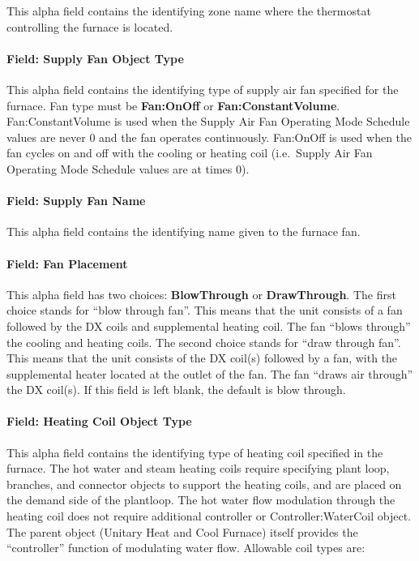 This alpha field contains the identifying zone name where the thermostat controlling the furnace is located.

\paragraph{Field: Supply Fan Object Type}\label{field-supply-fan-object-type-1}

This alpha field contains the identifying type of supply air fan specified for the furnace. Fan type must be \textbf{Fan:OnOff} or \textbf{Fan:ConstantVolume}. Fan:ConstantVolume is used when the Supply Air Fan Operating Mode Schedule values are never 0 and the fan operates continuously. Fan:OnOff is used when the fan cycles on and off with the cooling or heating coil (i.e.~Supply Air Fan Operating Mode Schedule values are at times 0).

\paragraph{Field: Supply Fan Name}\label{field-supply-fan-name-1}

This alpha field contains the identifying name given to the furnace fan.

\paragraph{Field: Fan Placement}\label{field-fan-placement-1}

This alpha field has two choices: \textbf{BlowThrough} or \textbf{DrawThrough}. The first choice stands for ``blow through fan''. This means that the unit consists of a fan followed by the DX coils and supplemental heating coil. The fan ``blows through'' the cooling and heating coils. The second choice stands for ``draw through fan''. This means that the unit consists of the DX coil(s) followed by a fan, with the supplemental heater located at the outlet of the fan. The fan ``draws air through'' the DX coil(s). If this field is left blank, the default is blow through.

\paragraph{Field: Heating Coil Object Type}\label{field-heating-coil-object-type-1-000}

This alpha field contains the identifying type of heating coil specified in the furnace. The hot water and steam heating coils require specifying plant loop, branches, and connector objects to support the heating coils, and are placed on the demand side of the plantloop. The hot water flow modulation through the heating coil does not require additional controller or Controller:WaterCoil object. The parent object (Unitary Heat and Cool Furnace) itself provides the ``controller'' function of modulating water flow. Allowable coil types are:

